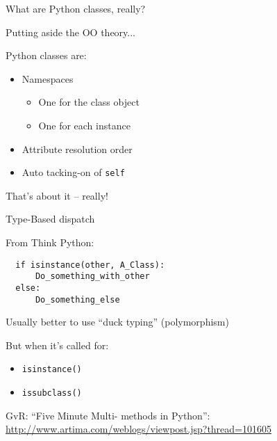 \documentclass{beamer}
\begin{document}
\begin{frame}[fragile]{What are Python classes, really?}

{\Large Putting aside the OO theory...}

\vfill
{\Large Python classes are:}

\begin{itemize}
  \item Namespaces
  \begin{itemize}
    \item One for the class object
    \item One for each instance
  \end{itemize}
  \item Attribute resolution order
  \item Auto tacking-on of \verb|self|
\end{itemize}

\vfill
{\Large That's about it -- really!}

\end{frame} 

\begin{frame}[fragile]{Type-Based dispatch}

{\Large From Think Python:}

\begin{verbatim}
  if isinstance(other, A_Class):
      Do_something_with_other
  else:
      Do_something_else
\end{verbatim}

\vfill
{\Large Usually better to use ``duck typing'' (polymorphism)}

\vfill
{\Large But when it's called for:}
\begin{itemize}
    \item \verb|isinstance()|
    \item \verb|issubclass()|
\end{itemize}

\vfill
GvR: ``Five Minute Multi- methods in Python'':\\
{\small \url{http://www.artima.com/weblogs/viewpost.jsp?thread=101605} }

\end{frame} 
\end{document}
